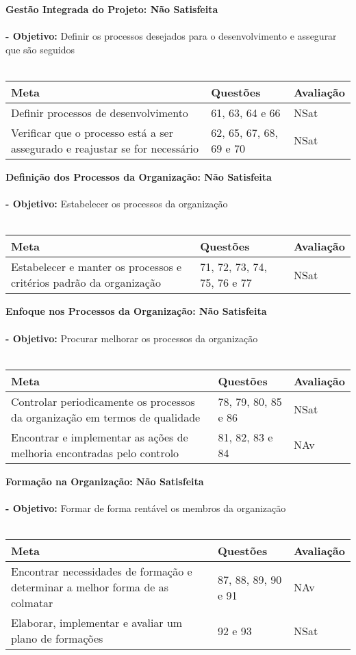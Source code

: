 \documentclass[openany,10pt,a4paper]{article}
\begin{document}
\textbf{Gestão Integrada do Projeto: Não Satisfeita} \\  \\
\textbf{- Objetivo:} Definir os processos desejados para o desenvolvimento e assegurar que são seguidos \\
\\
\begin{tabular}{p{3in}|p{1.5in}|p{1.5in}}	
\textbf{Meta} & \textbf{Questões} & \textbf{Avaliação} \\ \hline
Definir processos de desenvolvimento & 61, 63, 64 e 66 & NSat \\
Verificar que o processo está a ser assegurado e reajustar se for necessário & 62, 65, 67, 68, 69 e 70 & NSat \\ 
\end{tabular}

\textbf{Definição dos Processos da Organização: Não Satisfeita} \\  \\
\textbf{- Objetivo:} Estabelecer os processos da organização \\
\\
\begin{tabular}{p{3in}|p{1.5in}|p{1.5in}}		
\textbf{Meta} & \textbf{Questões} & \textbf{Avaliação} \\ \hline
Estabelecer e manter os processos e critérios padrão da organização & 71, 72, 73, 74, 75, 76 e 77 & NSat \\
\end{tabular}

\textbf{Enfoque nos Processos da Organização: Não Satisfeita} \\  \\
\textbf{- Objetivo:} Procurar melhorar os processos da organização \\
\\
\begin{tabular}{p{3in}|p{1.5in}|p{1.5in}}		
\textbf{Meta} & \textbf{Questões} & \textbf{Avaliação} \\ \hline
Controlar periodicamente os processos da organização em termos de qualidade & 78, 79, 80, 85 e 86 & NSat \\
Encontrar e implementar as ações de melhoria encontradas pelo controlo & 81, 82, 83 e 84 & NAv \\ 
\end{tabular}

\textbf{Formação na Organização: Não Satisfeita} \\  \\
\textbf{- Objetivo:} Formar de forma rentável os membros da organização \\
\\
\begin{tabular}{p{3in}|p{1.5in}|p{1.5in}}		
\textbf{Meta} & \textbf{Questões} & \textbf{Avaliação} \\ \hline
Encontrar necessidades de formação e determinar a melhor forma de as colmatar & 87, 88, 89, 90 e 91 & NAv \\
Elaborar, implementar e avaliar um plano de formações & 92 e 93 & NSat \\
\end{tabular}
\end{document}
